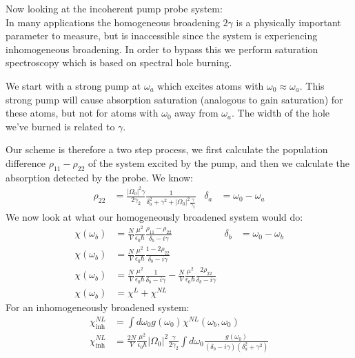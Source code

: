 Now looking at the incoherent pump probe system:\\
In many applications the homogeneous broadening $2\gamma$ is a physically important parameter to measure, but is inaccessible since the system is experiencing inhomogeneous broadening.
In order to bypass this we perform saturation spectroscopy which is based on spectral hole burning.

We start with a strong pump at $\omega_a$ which excites atoms with $\omega_0\approx\omega_a$. This strong pump will cause absorption saturation (analogous to gain saturation) for these atoms, but not for atoms with $\omega_0$ away from $\omega_a$.
The width of the hole we've burned is related to $\gamma$.

Our scheme is therefore a two step process, we first calculate the population difference $\rho_{11} - \rho_{22}$ of the system excited by the pump, and then we calculate the absorption detected by the probe.
We know:
\begin{align*}
	\rho_{22} &= \frac{|\Omega_0|^2 \gamma}{2\gamma_2} \frac{1}{\delta_a^2 + \gamma^2 + |\Omega_0|^2\frac{\gamma}{\gamma_2}} &
	\delta_a &= \omega_0 - \omega_a
\end{align*}
We now look at what our homogeneously broadened system would do:
\begin{align*}
	\chi(\omega_b) &= \frac{N}{V} \frac{\mu^2}{\epsilon_0\hbar} \frac{\rho_{11} - \rho_{22}}{\delta_b - i\gamma} &
	\delta_b &= \omega_0 - \omega_b \\
	\chi(\omega_b) &= \frac{N}{V} \frac{\mu^2}{\epsilon_0\hbar} \frac{1- 2\rho_{22}}{\delta_b - i\gamma} && \\
	\chi(\omega_b) &= \frac{N}{V} \frac{\mu^2}{\epsilon_0\hbar} \frac{1}{\delta_b - i\gamma} -\frac{N}{V} \frac{\mu^2}{\epsilon_0\hbar} \frac{2\rho_{22}}{\delta_b - i\gamma} && \\
	\chi(\omega_b) &= \chi^L + \chi^{NL} &&
\end{align*}
For an inhomogeneously broadened system:
\begin{align*}
	\chi_\text{inh}^{NL} &= \int d\omega_0 g(\omega_0) \chi^{NL}(\omega_b,\omega_0) \\
	\chi_\text{inh}^{NL} &= \frac{2N}{V} \frac{\mu^2}{\epsilon_0\hbar}|\Omega_0|^2 \frac{\gamma}{2\gamma_2}\int d\omega_0 \frac{g(\omega_0)}{(\delta_b - i\gamma)(\delta_a^2 + \gamma^2)}
\end{align*}
